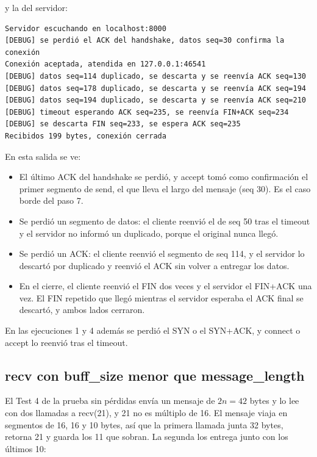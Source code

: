 \documentclass[
	spanish, %
	letterpaper, oneside
]{article}
\newcommand{\code}[1]{#1}     %
\newcommand{\flag}[1]{#1}     %
\begin{document}
\noindent y la del servidor:

{\small
\begin{verbatim}
Servidor escuchando en localhost:8000
[DEBUG] se perdió el ACK del handshake, datos seq=30 confirma la conexión
Conexión aceptada, atendida en 127.0.0.1:46541
[DEBUG] datos seq=114 duplicado, se descarta y se reenvía ACK seq=130
[DEBUG] datos seq=178 duplicado, se descarta y se reenvía ACK seq=194
[DEBUG] datos seq=194 duplicado, se descarta y se reenvía ACK seq=210
[DEBUG] timeout esperando ACK seq=235, se reenvía FIN+ACK seq=234
[DEBUG] se descarta FIN seq=233, se espera ACK seq=235
Recibidos 199 bytes, conexión cerrada
\end{verbatim}}

En esta salida se ve:
\begin{itemize}
	\item El último \flag{ACK} del handshake se perdió, y \code{accept} tomó como confirmación el
	primer segmento de \code{send}, el que lleva el largo del mensaje (seq 30). Es el caso borde
	del paso 7.
	\item Se perdió un segmento de datos: el cliente reenvió el de seq 50 tras el timeout y el
	servidor no informó un duplicado, porque el original nunca llegó.
	\item Se perdió un \flag{ACK}: el cliente reenvió el segmento de seq 114, y el servidor lo
	descartó por duplicado y reenvió el \flag{ACK} sin volver a entregar los datos.
	\item En el cierre, el cliente reenvió el \flag{FIN} dos veces y el servidor el \flag{FIN+ACK}
	una vez. El \flag{FIN} repetido que llegó mientras el servidor esperaba el \flag{ACK} final se
	descartó, y ambos lados cerraron.
\end{itemize}

En las ejecuciones 1 y 4 además se perdió el \flag{SYN} o el \flag{SYN+ACK}, y \code{connect} o
\code{accept} lo reenvió tras el timeout.

\subsection{recv con buff\_size menor que message\_length}
\label{sec:pruebas-buff-size}
El Test 4 de la prueba sin pérdidas envía un mensaje de $2n = 42$ bytes y lo lee con dos
llamadas a \code{recv(21)}, y 21 no es múltiplo de 16. El mensaje viaja en segmentos de 16, 16 y
10 bytes, así que la primera llamada junta 32 bytes, retorna 21 y guarda los 11 que sobran. La
segunda los entrega junto con los últimos 10:
\end{document}
